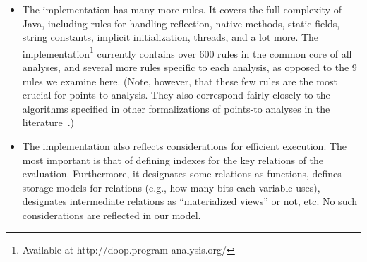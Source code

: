\begin{itemize}
\item The implementation has many more rules. It covers the full
  complexity of Java, including rules for handling reflection, native
  methods, static fields, string constants, implicit initialization,
  threads, and a lot more. The \doop{}
  implementation\footnote{Available at
    http://doop.program-analysis.org/} currently contains over 600
  rules in the common core of all analyses, and several more rules
  specific to each analysis, as opposed to the 9 rules we examine
  here. (Note, however, that these few rules are the most crucial for
  points-to analysis. They also correspond fairly closely to the
  algorithms specified in other formalizations of points-to analyses
  in the literature~\cite{pldi:2010:Might,popl:2011:Smaragdakis}.)

\item The implementation also reflects considerations for efficient
  execution. The most important is that of defining indexes for the
  key relations of the evaluation. Furthermore, it designates some
  relations as functions, defines storage models for relations (e.g.,
  how many bits each variable uses), designates intermediate relations
  as ``materialized views'' or not, etc. No such considerations are
  reflected in our model.
\end{itemize}

